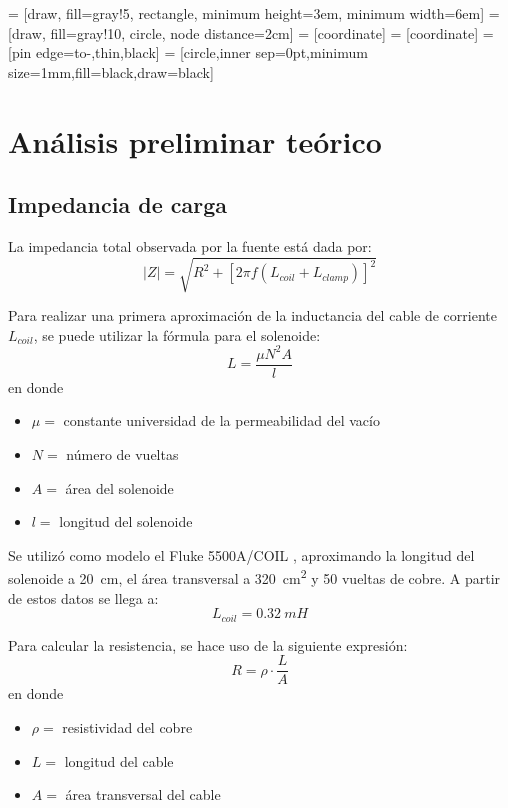 \documentclass[titlepage, 12pt]{article}
\begin{document}
\usetikzlibrary{shapes, arrows, babel}
 = [draw, fill=gray!5, rectangle, 
    minimum height=3em, minimum width=6em]
 = [draw, fill=gray!10, circle, node distance=2cm]
 = [coordinate]
 = [coordinate]
 = [pin edge={to-,thin,black}]
 = [circle,inner sep=0pt,minimum size=1mm,fill=black,draw=black]

\def\normalcoord(#1){coordinate(#1)}
\def\showcoord(#1){node[circle, red, draw, inner sep=1pt, pin={[red, overlay, inner sep=0.5pt, font=\tiny, pin distance=0.1cm, pin edge={red, overlay}]45:#1}](#1){}}
\let\coord=\normalcoord

\renewcommand{\listtablename}{Índice de tablas}
\renewcommand{\tablename}{Tabla}

\section{Análisis preliminar teórico}
\subsection{Impedancia de carga}
La impedancia total observada por la fuente está dada por:
\[
    |Z| = \sqrt{ R^2 + [2\pi f (L_{coil} + L_{clamp})]^2 }
\]

Para realizar una primera aproximación de la inductancia del cable de corriente $L_{coil}$, se puede utilizar la fórmula para el solenoide:
\[
    L = \frac{ \mu N^2 A }{ l }
\]
en donde
\begin{itemize}
    \item $\mu =$ constante universidad de la permeabilidad del vacío
    \item $N =$ número de vueltas
    \item $A =$ área del solenoide
    \item $l =$ longitud del solenoide
\end{itemize}

Se utilizó como modelo el Fluke 5500A/COIL \cite{Fluke5500A/COIL}, aproximando la longitud del solenoide a \SI{20}{cm}, el área transversal a \SI{320}{cm^2} y 50 vueltas de cobre. A partir de estos datos se llega a:
\[
    L_{coil} = \SI{0,32}{mH}
\]

Para calcular la resistencia, se hace uso de la siguiente expresión:
\[
    R = \rho \cdot \frac{L}{A}
\]
en donde
\begin{itemize}
    \item $\rho =$ resistividad del cobre
    \item $L =$ longitud del cable
    \item $A =$ área transversal del cable
\end{itemize}
\end{document}
